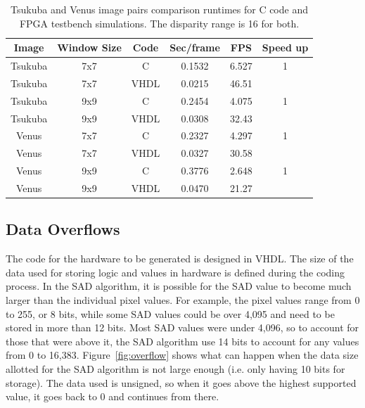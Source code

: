 \begin{table}
	\begin{center}
		\begin{tabu}{|c|c|c|c|c|c|}
			\hline
				\rowstyle{\bfseries} Image & 
				\rowstyle{\bfseries} Window Size & 
				\rowstyle{\bfseries} Code & 
				\rowstyle{\bfseries} Sec/frame & 
				\rowstyle{\bfseries} FPS &
				\rowstyle{\bfseries} Speed up
			\\ \hline 
			Tsukuba & 7x7 & C & 0.1532 & 6.527 & 1
			\\ \hline 
			Tsukuba & 7x7 & VHDL & 0.0215 & 46.51 & 
			\\ \tabucline[2pt]{-}
			Tsukuba & 9x9 & C & 0.2454 & 4.075 & 1
			\\ \hline 
			Tsukuba & 9x9 & VHDL & 0.0308 & 32.43 & 
			\\ \tabucline[2pt]{-}
			Venus & 7x7 & C & 0.2327 & 4.297 & 1
			\\ \hline 
			Venus & 7x7 & VHDL & 0.0327 & 30.58 & 
			\\ \tabucline[2pt]{-}
			Venus & 9x9 & C & 0.3776 & 2.648 & 1
			\\ \hline 
			Venus & 9x9 & VHDL & 0.0470 & 21.27 & 
			\\ \hline 
		\end{tabu}	
		\captionfonts
		\caption{Tsukuba and Venus image pairs comparison runtimes for C code and FPGA testbench simulations. The disparity range is 16 for both.}
		\label{table:runtimeComp}
	\end{center}
\end{table}

\subsection{Data Overflows}
\label{sec:overflow}

The code for the hardware to be generated is designed in VHDL. The size of the data used for storing logic and values in hardware is defined during the coding process. In the SAD algorithm, it is possible for the SAD value to become much larger than the individual pixel values. For example, the pixel values range from 0 to 255, or 8 bits, while some SAD values could be over 4,095 and need to be stored in more than 12 bits. Most SAD values were under 4,096, so to account for those that were above it, the SAD algorithm use 14 bits to account for any values from 0 to 16,383. Figure~\ref{fig:overflow} shows what can happen when the data size allotted for the SAD algorithm is not large enough (i.e. only having 10 bits for storage). The data used is unsigned, so when it goes above the highest supported value, it goes back to 0 and continues from there.

